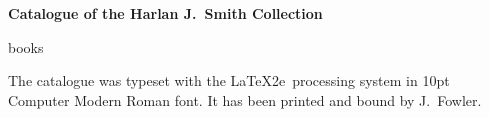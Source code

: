 \documentclass[letterpaper]{book}
\begin{document}
\mainmatter
\begin{center}
  {\Large \bf Catalogue of the Harlan J.\ Smith Collection}
\end{center}
\bigskip
{books}


\backmatter

  \printindex[author]

\begin{colophon}
  The catalogue was typeset with the \LaTeX2e\ processing system in
  10pt Computer Modern Roman font. It has been printed and
  bound by J.~Fowler.
\end{colophon}
\end{document}
